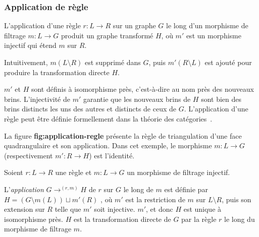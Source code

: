 \subsubsection[Application de règle]{Application de règle}
\label{sec:etat-art-jerboa-application-regle}


L'application d'une règle $r: L \longrightarrow R$ sur un graphe $G$ le long d'un morphisme de
filtrage $m: L \rightarrow G$ produit un graphe transformé $H$, où $m'$ est un morphisme
injectif qui étend $m$ sur $R$.

Intuitivement, $m(L \setminus R)$ est supprimé dans $G$, puis $m'(R \setminus L)$ est ajouté
pour produire la transformation directe $H$.

$m'$ et $H$ sont définis à isomorphisme près, c'est-à-dire au nom près des
nouveaux brins. L'injectivité de $m'$ garantie que les nouveaux brins de $H$
sont bien des brins distincts les uns des autres et distincts de ceux de $G$.
L'application d'une règle peut être définie formellement dans la théorie des
catégories~\cite{bellet2010designing,pascual2022topological,poudret2008graph}.


La figure \textbf{fig:application-regle} présente la règle de triangulation d'une face quadrangulaire et son application.
Dans cet exemple, le morphisme $m : L \to G$ (respectivement $m' : R \to H$) est l'identité.

\begin{definition}
	Soient $r: L \longrightarrow R$ une règle et $m : L \rightarrow G$ un morphisme de filtrage injectif.

	L'\emph{application} $G \longrightarrow^{(r, m)} H$ de $r$ sur $G$ le long de $m$ est définie par $H = (G \setminus m(L))\sqcup m'(R)$ , où $m'$ est la restriction de $m$ sur $L \setminus R$, puis son extension sur $R$ telle que $m'$ soit injective. $m'$, et donc $H$ est unique à isomorphisme près.
	$H$ est la transformation directe de $G$ par la règle $r$ le long du morphisme de filtrage $m$.
\end{definition}

